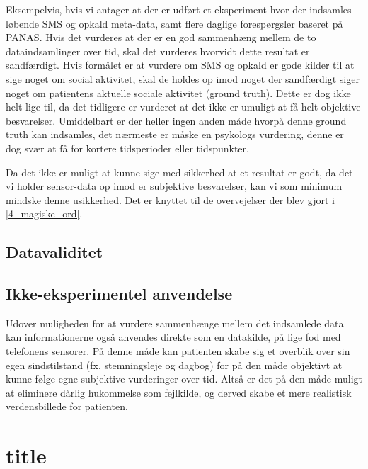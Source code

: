 Eksempelvis, hvis vi antager at der er udført et eksperiment hvor der indsamles løbende SMS og opkald meta-data, samt flere daglige forespørgsler baseret på PANAS.
Hvis det vurderes at der er en god sammenhæng mellem de to dataindsamlinger over tid, skal det vurderes hvorvidt dette resultat er sandfærdigt.
Hvis formålet er at vurdere om SMS og opkald er gode kilder til at sige noget om social aktivitet, skal de holdes op imod noget der sandfærdigt siger noget om patientens aktuelle sociale aktivitet (ground truth).
Dette er dog ikke helt lige til, da det tidligere er vurderet at det ikke er umuligt at få helt objektive besvarelser.
Umiddelbart er der heller ingen anden måde hvorpå denne ground truth kan indsamles, det nærmeste er måske en psykologs vurdering, denne er dog svær at få for kortere tidsperioder eller tidspunkter.

Da det ikke er muligt at kunne sige med sikkerhed at et resultat er godt, da det vi holder sensor-data op imod er subjektive besvarelser, kan vi som minimum mindske denne usikkerhed.
Det er knyttet til de overvejelser der blev gjort i \ref{4_magiske_ord}.

\subsection{Datavaliditet}

\subsection{Ikke-eksperimentel anvendelse}
Udover muligheden for at vurdere sammenhænge mellem det indsamlede data kan informationerne også anvendes direkte som en datakilde, på lige fod med telefonens sensorer.
På denne måde kan patienten skabe sig et overblik over sin egen sindstilstand (fx. stemningsleje og dagbog) for på den måde objektivt at kunne følge egne subjektive vurderinger over tid.
Altså er det på den måde muligt at eliminere dårlig hukommelse som fejlkilde, og derved skabe et mere realistisk verdensbillede for patienten.

\section{title}
